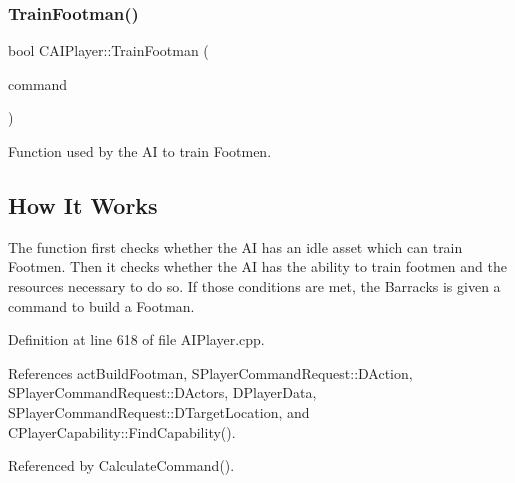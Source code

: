 \subsubsection{\texorpdfstring{Train\+Footman()}{TrainFootman()}}
{\footnotesize\ttfamily bool C\+A\+I\+Player\+::\+Train\+Footman (\begin{DoxyParamCaption}\item[{\hyperlink{structSPlayerCommandRequest}{S\+Player\+Command\+Request} \&}]{command }\end{DoxyParamCaption})\hspace{0.3cm}{\ttfamily [protected]}}



Function used by the AI to train Footmen. 

\hypertarget{classCAIPlayer_tfhow_sec}{}\subsection{How It Works}\label{classCAIPlayer_tfhow_sec}
The function first checks whether the AI has an idle asset which can train Footmen. Then it checks whether the AI has the ability to train footmen and the resources necessary to do so. If those conditions are met, the Barracks is given a command to build a Footman. 

Definition at line 618 of file A\+I\+Player.\+cpp.



References act\+Build\+Footman, S\+Player\+Command\+Request\+::\+D\+Action, S\+Player\+Command\+Request\+::\+D\+Actors, D\+Player\+Data, S\+Player\+Command\+Request\+::\+D\+Target\+Location, and C\+Player\+Capability\+::\+Find\+Capability().



Referenced by Calculate\+Command().


